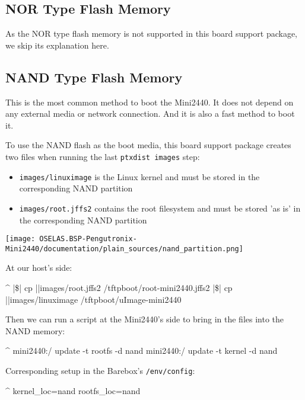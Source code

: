 \subsection{NOR Type Flash Memory}

As the NOR type flash memory is not supported in this board support package,
we skip its explanation here.

\subsection{NAND Type Flash Memory}				\label{sec:nandflashmem}

This is the most common method to boot the Mini2440. It does not depend on
any external media or network connection. And it is also a fast method to
boot it.

To use the NAND flash as the boot media, this board support package creates
two files when running the last \texttt{ptxdist images} step:

\begin{itemize}
\item \texttt{\ptxdistPlatformDir images/linuximage} is the Linux kernel
	and must be stored in the corresponding NAND partition
\item \texttt{\ptxdistPlatformDir images/root.jffs2} contains the root filesystem
	and must be stored 'as is' in the corresponding NAND partition
\end{itemize}

\centerline{\texttt{[image: OSELAS.BSP-Pengutronix-Mini2440/documentation/plain\_sources/nand\_partition.png]}}

At our host's side:

\begin{ptxshell}[escapechar=|]{^}
|\$| cp |\ptxdistPlatformDir |images/root.jffs2 /tftpboot/root-mini2440.jffs2
|\$| cp |\ptxdistPlatformDir |images/linuximage /tftpboot/uImage-mini2440
\end{ptxshell}

Then we can run a script at the Mini2440's side to bring in the files into the
NAND memory:

\begin{ptxshell}[escapechar=|]{^}
mini2440:/ update -t rootfs -d nand
mini2440:/ update -t kernel -d nand
\end{ptxshell}

Corresponding setup in the Barebox's \texttt{/env/config}:

\begin{ptxshell}[escapechar=|]{^}
kernel_loc=nand
rootfs_loc=nand
\end{ptxshell}

